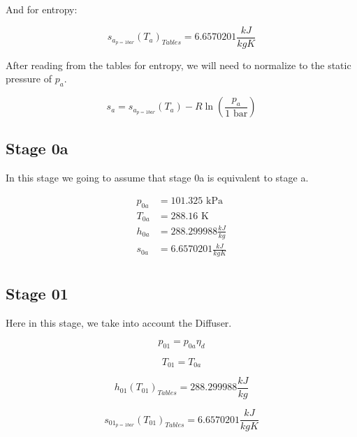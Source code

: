 \documentclass[titlepage]{article}
\begin{document}
    And for entropy:

    \begin{equation}
        s_{a_{p=1 bar}}(T_{a})_{Tables} = 6.6570201 \frac{kJ}{kg K}
    \end{equation}

    After reading from the tables for entropy, we will need to normalize to the static pressure of $p_{a}$.

    \begin{equation}
        s_{a} = s_{a_{p=1 bar}}(T_{a}) - R \ln \left( \frac{p_{a}}{1 \text{ bar}} \right)
    \end{equation}

    \subsection{Stage 0a}
    In this stage we going to assume that stage 0a is equivalent to stage a. 

    \begin{equation}
        \begin{aligned}
            \text{$p_{0a}$} &= 101.325 \text{ kPa} \\
            \text{$T_{0a}$} &= 288.16 \text{ K} \\
            \text{$h_{0a}$} &= 288.299988 \frac{kJ}{kg} \\
            \text{$s_{0a}$} &= 6.6570201 \frac{kJ}{kg K} \\
        \end{aligned}
    \end{equation}

    \subsection{Stage 01}

    Here in this stage, we take into account the Diffuser. 

    \begin{equation} 
        p_{01} = p_{0a} \eta_{d}
    \end{equation}

    \begin{equation}
        T_{01} = T_{0a} 
    \end{equation}

    \begin{equation}
        h_{01}(T_{01})_{Tables} = 288.299988 \frac{kJ}{kg}
    \end{equation}

    \begin{equation}
        s_{01_{p= 1 bar}}(T_{01})_{Tables} = 6.6570201 \frac{kJ}{kg K}
    \end{equation}
\end{document}
